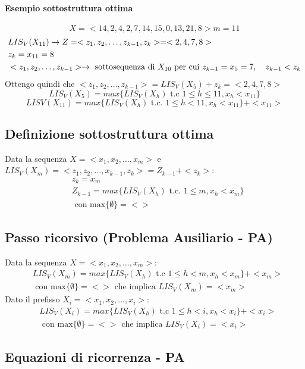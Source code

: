 \paragraph*{Esempio sottostruttura ottima}
\[X = <14, 2, 4, 2, 7, 14, 15, 0, 13, 21, 8> m = 11\]
\begin{align*}
    &LIS_V(X_{11}) \rightarrow Z=<z_1, z_2, \dots, z_{k-1}, z_k> = <2,4,7,8>\\
    &z_k = x_{11} = 8\\
    &<z_1,z_2,\dots, z_{k-1}> \rightarrow \text{ sottosequenza di }X_{10} \text{ per cui } z_{k-1}=x_5 = 7, \quad z_{k-1}<z_k\\
\end{align*}
Ottengo quindi che $<z_1,z_2,\dots, z_{k-1}> = LIS_V(X_5) + z_k = <2,4,7,8>$\\
\[LIS_V(X_5) = max\{LIS_V(X_h) \text{ t.c } 1 \leq h \leq 11, x_h < x_11\}\]
\[LISV(X_11) = max\{LIS_V(X_h) \text{ t.c. } 1 \leq h < 11, x_h < x_11\} + <x_11>\]
\subsection{Definizione sottostruttura ottima}
Data la sequenza $X=<x_1, x_2, \dots, x_m>$ e $LIS_V(X_m) = <z_1, z_2,\dots, x_{k-1}, z_k> = Z_{k-1} + <z_k>$:
\begin{align*}
    &z_k = x_m\\
    &Z_{k-1}=max\{LIS_V(X_h) \text{ t.c. } 1 \leq m, x_h < x_m\}\\
    &\text{ con max}\{\emptyset \} = <>
\end{align*}
\subsection{Passo ricorsivo (Problema Ausiliario - PA)}
Data la sequenza $X = <x_1, x_2, \dots, x_m>$:
\begin{align*}
    &LIS_V(X_m) = max\{LIS_V(X_h) \text{ t.c } 1 \leq h < m, x_h < x_m\}+ <x_m>\\ 
    &\text{ con max}\{\emptyset\}=<> \text{ che implica } LIS_V(X_m) = <x_m>
\end{align*}
Dato il prefisso $X_i = <x_1, x_2, \dots, x_i>:$
\begin{align*}
    &LIS_V(X_i) = max\{LIS_V(X_h) \text{ t.c } 1 \leq h < i, x_h < x_i\}+ <x_i>\\ 
    &\text{ con max}\{\emptyset\}=<> \text{ che implica } LIS_V(X_i) = <x_i>
\end{align*}
\subsection{Equazioni di ricorrenza - PA}
